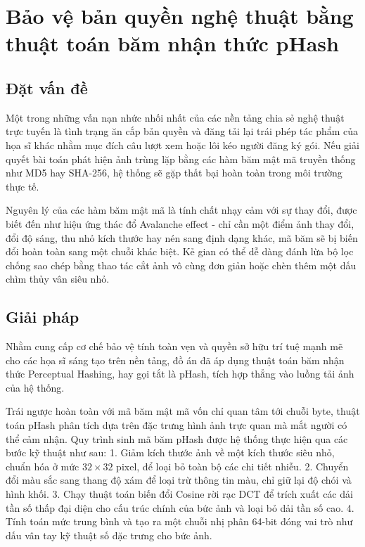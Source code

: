 \section{Bảo vệ bản quyền nghệ thuật bằng thuật toán băm nhận thức pHash}

\subsection{Đặt vấn đề}
Một trong những vấn nạn nhức nhối nhất của các nền tảng chia sẻ nghệ thuật trực tuyến là tình trạng ăn cắp bản quyền và đăng tải lại trái phép tác phẩm của họa sĩ khác nhằm mục đích câu lượt xem hoặc lôi kéo người đăng ký gói. Nếu giải quyết bài toán phát hiện ảnh trùng lặp bằng các hàm băm mật mã truyền thống như MD5 hay SHA-256, hệ thống sẽ gặp thất bại hoàn toàn trong môi trường thực tế. 

Nguyên lý của các hàm băm mật mã là tính chất nhạy cảm với sự thay đổi, được biết đến như hiệu ứng thác đổ Avalanche effect - chỉ cần một điểm ảnh thay đổi, đổi độ sáng, thu nhỏ kích thước hay nén sang định dạng khác, mã băm sẽ bị biến đổi hoàn toàn sang một chuỗi khác biệt. Kẻ gian có thể dễ dàng đánh lừa bộ lọc chống sao chép bằng thao tác cắt ảnh vô cùng đơn giản hoặc chèn thêm một dấu chìm thủy vân siêu nhỏ.

\subsection{Giải pháp}
Nhằm cung cấp cơ chế bảo vệ tính toàn vẹn và quyền sở hữu trí tuệ mạnh mẽ cho các họa sĩ sáng tạo trên nền tảng, đồ án đã áp dụng thuật toán băm nhận thức Perceptual Hashing, hay gọi tắt là pHash, tích hợp thẳng vào luồng tải ảnh của hệ thống.

Trái ngược hoàn toàn với mã băm mật mã vốn chỉ quan tâm tới chuỗi byte, thuật toán pHash phân tích dựa trên đặc trưng hình ảnh trực quan mà mắt người có thể cảm nhận. Quy trình sinh mã băm pHash được hệ thống thực hiện qua các bước kỹ thuật như sau:
1. Giảm kích thước ảnh về một kích thước siêu nhỏ, chuẩn hóa ở mức $32 \times 32$ pixel, để loại bỏ toàn bộ các chi tiết nhiễu.
2. Chuyển đổi màu sắc sang thang độ xám để loại trừ thông tin màu, chỉ giữ lại độ chói và hình khối.
3. Chạy thuật toán biến đổi Cosine rời rạc DCT để trích xuất các dải tần số thấp đại diện cho cấu trúc chính của bức ảnh và loại bỏ dải tần số cao.
4. Tính toán mức trung bình và tạo ra một chuỗi nhị phân 64-bit đóng vai trò như dấu vân tay kỹ thuật số đặc trưng cho bức ảnh.

